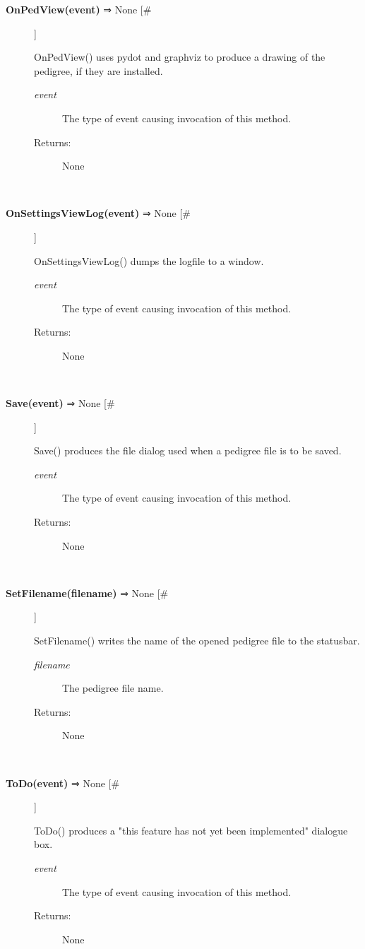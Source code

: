 \begin{description}
\item[\textbf{OnPedView(event)} ⇒ None [\#]
]
\par OnPedView() uses pydot and graphviz to produce a drawing of the pedigree,
if they are installed.
\begin{description}
\item[\textit{event}
]
The type of event causing invocation of this method.
\item[Returns:
]
None
\end{description}\\

\item[\textbf{OnSettingsViewLog(event)} ⇒ None [\#]
]
\par OnSettingsViewLog() dumps the logfile to a window.
\begin{description}
\item[\textit{event}
]
The type of event causing invocation of this method.
\item[Returns:
]
None
\end{description}\\

\item[\textbf{Save(event)} ⇒ None [\#]
]
\par Save() produces the file dialog used when a pedigree file is to be saved.
\begin{description}
\item[\textit{event}
]
The type of event causing invocation of this method.
\item[Returns:
]
None
\end{description}\\

\item[\textbf{SetFilename(filename)} ⇒ None [\#]
]
\par SetFilename() writes the name of the opened pedigree file to the statusbar.
\begin{description}
\item[\textit{filename}
]
The pedigree file name.
\item[Returns:
]
None
\end{description}\\

\item[\textbf{ToDo(event)} ⇒ None [\#]
]
\par ToDo() produces a "this feature has not yet been implemented" dialogue box.
\begin{description}
\item[\textit{event}
]
The type of event causing invocation of this method.
\item[Returns:
]
None
\end{description}\\

\end{description}
